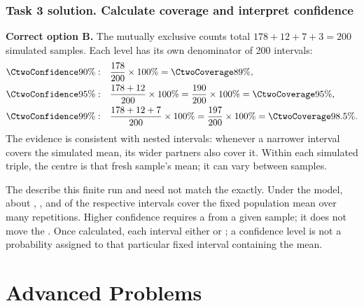 \clearpage
\noindent\begin{minipage}{\linewidth}
\subsubsection*{Task 3 solution. Calculate coverage and interpret confidence}
\label{sol:c2-compare-three-c}

\textbf{Correct option B.} The mutually exclusive counts total $178+12+7+3=200$ simulated samples. Each level has its own denominator of 200 intervals:
\begin{align*}
    \CtwoConfidence{90\%}:\quad &\frac{178}{200}\times100\%=\CtwoCoverage{89\%},\\
    \CtwoConfidence{95\%}:\quad &\frac{178+12}{200}\times100\%=\frac{190}{200}\times100\%=\CtwoCoverage{95\%},\\
    \CtwoConfidence{99\%}:\quad &\frac{178+12+7}{200}\times100\%=\frac{197}{200}\times100\%=\CtwoCoverage{98.5\%}.
\end{align*}
The evidence is consistent with nested intervals: whenever a narrower interval covers the simulated mean, its wider partners also cover it. Within each simulated triple, the centre is that fresh sample's mean; it can vary between samples.

The  describe this finite run and need not match the  exactly. Under the model, about , , and  of the respective intervals cover the fixed population mean over many repetitions. Higher confidence requires a  from a given sample; it does not move the . Once calculated, each interval either  or ; a confidence level is not a probability assigned to that particular fixed interval containing the mean.

\par\vspace{3mm}
\end{minipage}\par

\clearpage

\section{Advanced Problems}
\label{sec:advanced}


